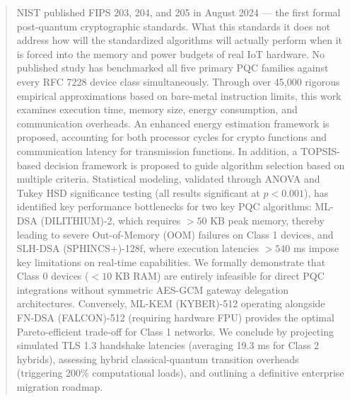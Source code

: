 \begin{abstract}
NIST published FIPS 203, 204, and 205 in August 2024 \cite{fips203, fips204, fips205} — the first formal post-quantum cryptographic standards. What this standards it does not address how will the standardized algorithms will actually perform when it is  forced into the memory and power budgets of real IoT hardware. No published study has benchmarked all five primary PQC families against every RFC 7228 device class simultaneously. Through over 45,000 rigorous empirical approximations based on bare-metal instruction limits, this work examines execution time, memory size, energy consumption, and communication overheads. An enhanced energy estimation framework is proposed, accounting for both processor cycles for crypto functions and communication latency for transmission functions. In addition, a TOPSIS-based decision framework is proposed to guide algorithm selection based on multiple criteria. Statistical modeling, validated through ANOVA and Tukey HSD significance testing (all results significant at $p < 0.001$), has identified key performance bottlenecks for two key PQC algorithms: ML-DSA (DILITHIUM)-2, which requires $>50$ KB peak memory, thereby leading to severe Out-of-Memory (OOM) failures on Class 1 devices, and SLH-DSA (SPHINCS+)-128f, where execution latencies $>540$ ms impose key limitations on real-time capabilities. We formally demonstrate that Class 0 devices ($< 10$ KB RAM) are entirely infeasible for direct PQC integrations without symmetric AES-GCM gateway delegation architectures. Conversely, ML-KEM (KYBER)-512 operating alongside FN-DSA (FALCON)-512 (requiring hardware FPU) provides the optimal Pareto-efficient trade-off for Class 1 networks. We conclude by projecting simulated TLS 1.3 handshake latencies (averaging 19.3 ms for Class 2 hybrids), assessing hybrid classical-quantum transition overheads (triggering 200\% computational loads), and outlining a definitive enterprise migration roadmap.
\end{abstract}
